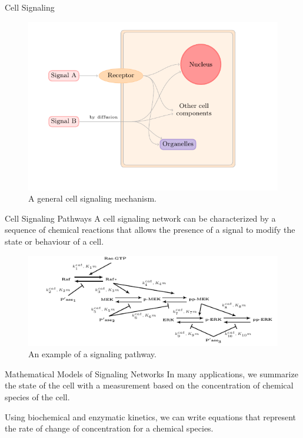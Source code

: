 \documentclass{beamer}
\begin{document}
\begin{frame}{Cell Signaling}
\begin{figure}
    \includegraphics[clip=True, scale=.85]{introduction/signaling_mechanism.pdf}
    \caption{A general cell signaling mechanism.}
\end{figure}
\end{frame}

\begin{frame}{Cell Signaling Pathways}
A cell signaling network can be characterized by a sequence of chemical 
reactions that allows the presence of a signal to modify the state or 
behaviour of a cell.
\begin{figure}
    \includegraphics{introduction/csp_example.pdf}
    \caption{An example of a signaling pathway.}
\end{figure}
\end{frame}

\begin{frame}{Mathematical Models of Signaling Networks}
In many applications, we summarize the state of the cell with a 
measurement based on the concentration of chemical species of the cell.
\pause

Using biochemical and enzymatic kinetics, we can write equations that
represent the rate of change of concentration for a chemical species.
\end{frame}
\end{document}
